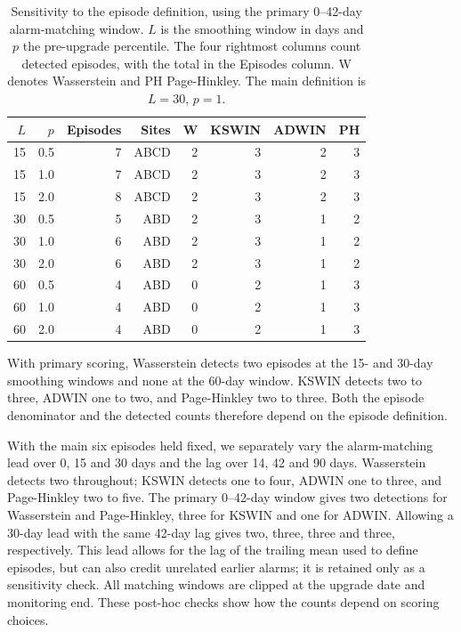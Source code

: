 \documentclass[preprint,12pt]{elsarticle}
\begin{document}
\begin{table}[htbp]\centering\small
\caption{Sensitivity to the episode definition, using the primary 0--42-day alarm-matching window. $L$ is the smoothing window in days and $p$ the pre-upgrade percentile. The four rightmost columns count detected episodes, with the total in the Episodes column. W denotes Wasserstein and PH Page-Hinkley. The main definition is $L=30$, $p=1$.}\label{tab:soil-sensitivity}
\setlength{\tabcolsep}{5pt}
\begin{tabular}{rrrrrrrr}
\toprule
$L$ & $p$ & Episodes & Sites & W & KSWIN & ADWIN & PH\\\midrule
15 & 0.5 & 7 & ABCD & 2 & 3 & 2 & 3\\
15 & 1.0 & 7 & ABCD & 2 & 3 & 2 & 3\\
15 & 2.0 & 8 & ABCD & 2 & 3 & 2 & 3\\
30 & 0.5 & 5 & ABD & 2 & 3 & 1 & 2\\
30 & 1.0 & 6 & ABD & 2 & 3 & 1 & 2\\
30 & 2.0 & 6 & ABD & 2 & 3 & 1 & 2\\
60 & 0.5 & 4 & ABD & 0 & 2 & 1 & 3\\
60 & 1.0 & 4 & ABD & 0 & 2 & 1 & 3\\
60 & 2.0 & 4 & ABD & 0 & 2 & 1 & 3\\
\bottomrule
\end{tabular}
\end{table}

With primary scoring, Wasserstein detects two episodes at the 15- and 30-day smoothing windows and none at the 60-day window. KSWIN detects two to three, ADWIN one to two, and Page-Hinkley two to three. Both the episode denominator and the detected counts therefore depend on the episode definition.

With the main six episodes held fixed, we separately vary the alarm-matching lead over 0, 15 and 30 days and the lag over 14, 42 and 90 days. Wasserstein detects two throughout; KSWIN detects one to four, ADWIN one to three, and Page-Hinkley two to five. The primary 0--42-day window gives two detections for Wasserstein and Page-Hinkley, three for KSWIN and one for ADWIN. Allowing a 30-day lead with the same 42-day lag gives two, three, three and three, respectively. This lead allows for the lag of the trailing mean used to define episodes, but can also credit unrelated earlier alarms; it is retained only as a sensitivity check. All matching windows are clipped at the upgrade date and monitoring end. These post-hoc checks show how the counts depend on scoring choices.

\begingroup\small
\setlength{\bibsep}{4pt plus 1pt minus 1pt}


\endgroup
\end{document}
